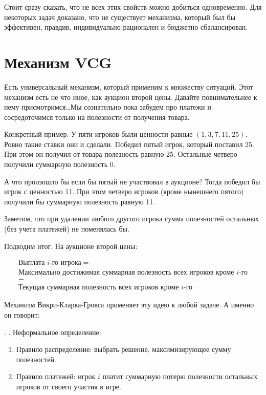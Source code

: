 Стоит сразу сказать, что не всех этих свойств можно добиться одновременно. Для некоторых задач доказано, что не существует механизма, который был бы эффективен, правдив, индивидуально рационален и бюджетно сбалансирован.


\section{Механизм VCG}

Есть универсальный механизм, который применим к множеству ситуаций. Этот механизм есть не что иное, как аукцион второй цены. Давайте повнимательнее к нему присмотримся\ldots Мы сознательно пока забудем про платежи и сосредоточимся только на полезности от получения товара.



Конкретный пример. У пяти игроков были ценности равные $ (1,3,7,11,25) $. Ровно такие ставки они и сделали. Победил пятый игрок, который поставил 25.  При этом он получил от товара полезность равную 25. Остальные четверо получили суммарную полезность 0.

А что произошло бы если бы пятый не участвовал в аукционе? Тогда победил бы игрок с ценностью 11. При этом четверо игроков (кроме нынешнего пятого) получили бы суммарную полезность равную 11.

Заметим, что при удалении любого другого игрока сумма полезностей остальных (без учета платежей) не поменялась бы.

Подводим итог. На аукционе второй цены:

\begin{multline}
\text{Выплата } i\text{-го игрока}=\\
\text{Максимально достижимая суммарная полезность всех игроков кроме }i\text{-го} \\
-\\
\text{Текущая суммарная полезность всех игроков кроме }i\text{-го}
\end{multline}

Механизм Викри-Кларка-Гровса применяет эту идею к любой задаче. А именно он говорит:

\begin{mydef}. . Неформальное определение:
\begin{enumerate}
\item Правило распределение: выбрать решение, максимизирующее сумму полезностей.
\item Правило платежей: игрок $ i $ платит суммарную потерю полезности остальных игроков от своего участия в игре.
\end{enumerate}
\end{mydef}

